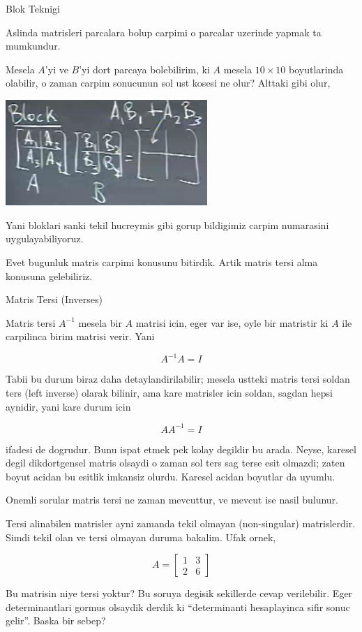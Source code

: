 \documentclass[12pt,fleqn]{article}\usepackage{../common}
\begin{document}
Blok Teknigi

Aslinda matrisleri parcalara bolup carpimi o parcalar uzerinde yapmak ta
mumkundur. 

Mesela $A$'yi ve $B$'yi dort parcaya bolebilirim, ki $A$ mesela $10 \times
10$ boyutlarinda olabilir, o zaman carpim sonucunun sol ust kosesi ne olur?
Alttaki gibi olur,

\includegraphics[height=4cm]{3_02.png}

Yani bloklari sanki tekil hucreymis gibi gorup bildigimiz carpim numarasini
uygulayabiliyoruz. 

Evet bugunluk matris carpimi konusunu bitirdik. Artik matris tersi alma
konusuna gelebiliriz. 

Matris Tersi (Inverses)

Matris tersi $A^{-1}$ mesela bir $A$ matrisi icin, eger var ise, oyle bir
matristir ki $A$ ile carpilinca birim matrisi verir. Yani

$$ A^{-1} A = I $$

Tabii bu durum biraz daha detaylandirilabilir; mesela ustteki matris tersi
soldan ters (left inverse) olarak bilinir, ama kare matrisler icin soldan,
sagdan hepsi aynidir, yani kare durum icin 

$$ AA^{-1} = I $$

ifadesi de dogrudur. Bunu ispat etmek pek kolay degildir bu arada. Neyse,
karesel degil dikdortgensel matris olsaydi o zaman sol ters sag terse esit
olmazdi; zaten boyut acidan bu esitlik imkansiz olurdu. Karesel acidan
boyutlar da uyumlu. 

Onemli sorular matris tersi ne zaman mevcuttur, ve mevcut ise nasil
bulunur. 

Tersi alinabilen matrisler ayni zamanda tekil olmayan (non-singular)
matrislerdir. Simdi tekil olan ve tersi olmayan duruma bakalim. Ufak ornek, 

$$ 
A = 
\left[\begin{array}{rr}
1 & 3 \\ 2 & 6
\end{array}\right]
 $$

Bu matrisin niye tersi yoktur? Bu soruya degisik sekillerde cevap
verilebilir. Eger determinantlari gormus olsaydik derdik ki ``determinanti
hesaplayinca sifir sonuc gelir''. Baska bir sebep? 
\end{document}
